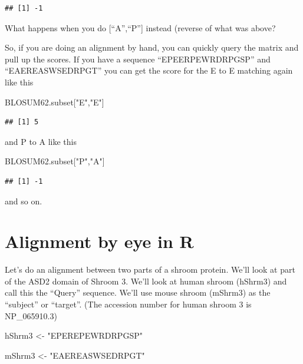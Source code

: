 \documentclass[
]{book}
\newenvironment{Shaded}{\begin{snugshade}}{\end{snugshade}}
\newcommand{\NormalTok}[1]{#1}
\newcommand{\OtherTok}[1]{\textcolor[rgb]{0.56,0.35,0.01}{#1}}
\newcommand{\StringTok}[1]{\textcolor[rgb]{0.31,0.60,0.02}{#1}}
\begin{document}
\begin{verbatim}
## [1] -1
\end{verbatim}

What happens when you do {[}``A'',``P''{]} instead (reverse of what was above?

So, if you are doing an alignment by hand, you can quickly query the matrix and pull up the scores. If you have a sequence ``EPEERPEWRDRPGSP'' and ``EAEREASWSEDRPGT'' you can get the score for the E to E matching again like this

\begin{Shaded}
\begin{Highlighting}[]
\NormalTok{BLOSUM62.subset[}\StringTok{"E"}\NormalTok{,}\StringTok{"E"}\NormalTok{]}
\end{Highlighting}
\end{Shaded}

\begin{verbatim}
## [1] 5
\end{verbatim}

and P to A like this

\begin{Shaded}
\begin{Highlighting}[]
\NormalTok{BLOSUM62.subset[}\StringTok{"P"}\NormalTok{,}\StringTok{"A"}\NormalTok{]}
\end{Highlighting}
\end{Shaded}

\begin{verbatim}
## [1] -1
\end{verbatim}

and so on.

\hypertarget{alignment-by-eye-in-r}{%
\section{Alignment by eye in R}\label{alignment-by-eye-in-r}}

Let's do an alignment between two parts of a shroom protein. We'll look at part of the ASD2 domain of Shroom 3. We'll look at human shroom (hShrm3) and call this the ``Query'' sequence. We'll use mouse shroom (mShrm3) as the ``subject'' or ``target''. (The accession number for human shroom 3 is NP\_065910.3)

\begin{Shaded}
\begin{Highlighting}[]
\NormalTok{hShrm3  }\OtherTok{\textless{}{-}} \StringTok{"EPEREPEWRDRPGSP"}

\NormalTok{mShrm3     }\OtherTok{\textless{}{-}} \StringTok{"EAEREASWSEDRPGT"}
\end{Highlighting}
\end{Shaded}
\end{document}

